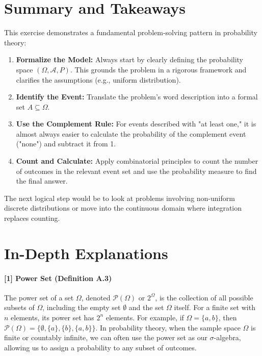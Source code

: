 \documentclass[11pt,a4paper]{article}
\begin{document}
\section{Summary and Takeaways}
This exercise demonstrates a fundamental problem-solving pattern in probability theory:
\begin{enumerate}
    \item \textbf{Formalize the Model:} Always start by clearly defining the probability space $(\Omega, \mathcal{A}, P)$. This grounds the problem in a rigorous framework and clarifies the assumptions (e.g., uniform distribution).
    \item \textbf{Identify the Event:} Translate the problem's word description into a formal set $A \subseteq \Omega$.
    \item \textbf{Use the Complement Rule:} For events described with "at least one," it is almost always easier to calculate the probability of the complement event ("none") and subtract it from 1.
    \item \textbf{Count and Calculate:} Apply combinatorial principles to count the number of outcomes in the relevant event set and use the probability measure to find the final answer.
\end{enumerate}
The next logical step would be to look at problems involving non-uniform discrete distributions or move into the continuous domain where integration replaces counting.

\newpage
\section*{In-Depth Explanations}
\hypertarget{note:powerset}{\label{note:powerset}}
\paragraph{[1] Power Set (Definition A.3)}
The power set of a set $\Omega$, denoted $\mathcal{P}(\Omega)$ or $2^\Omega$, is the collection of all possible subsets of $\Omega$, including the empty set $\emptyset$ and the set $\Omega$ itself. For a finite set with $n$ elements, its power set has $2^n$ elements. For example, if $\Omega = \{a, b\}$, then $\mathcal{P}(\Omega) = \{\emptyset, \{a\}, \{b\}, \{a, b\}\}$. In probability theory, when the sample space $\Omega$ is finite or countably infinite, we can often use the power set as our $\sigma$-algebra, allowing us to assign a probability to any subset of outcomes.

\vspace{1cm}
\hypertarget{note:laplace}{\label{note:laplace}}
\end{document}
